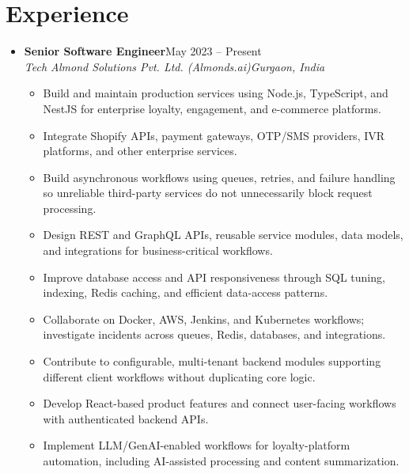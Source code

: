 \documentclass[letterpaper,10pt]{article}
\newcommand{\itemx}[1]{\item\small{#1\vspace{-2pt}}}
\newcommand{\subheading}[4]{\item \textbf{#1}\hfill #2\\\textit{\small #3}\hfill\textit{\small #4}\vspace{-5pt}}
\begin{document}
\section{Experience}
\begin{itemize}[leftmargin=.15in,label={}]
\subheading{Senior Software Engineer}{May 2023 -- Present}{Tech Almond Solutions Pvt. Ltd. (Almonds.ai)}{Gurgaon, India}
\begin{itemize}[leftmargin=.18in]
\itemx{Build and maintain production services using Node.js, TypeScript, and NestJS for enterprise loyalty, engagement, and e-commerce platforms.}
\itemx{Integrate Shopify APIs, payment gateways, OTP/SMS providers, IVR platforms, and other enterprise services.}
\itemx{Build asynchronous workflows using queues, retries, and failure handling so unreliable third-party services do not unnecessarily block request processing.}
\itemx{Design REST and GraphQL APIs, reusable service modules, data models, and integrations for business-critical workflows.}
\itemx{Improve database access and API responsiveness through SQL tuning, indexing, Redis caching, and efficient data-access patterns.}
\itemx{Collaborate on Docker, AWS, Jenkins, and Kubernetes workflows; investigate incidents across queues, Redis, databases, and integrations.}
\itemx{Contribute to configurable, multi-tenant backend modules supporting different client workflows without duplicating core logic.}
\itemx{Develop React-based product features and connect user-facing workflows with authenticated backend APIs.}
\itemx{Implement LLM/GenAI-enabled workflows for loyalty-platform automation, including AI-assisted processing and content summarization.}
\end{itemize}
\end{itemize}
\end{document}

